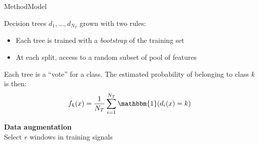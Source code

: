 \begin{frame}{Method}{Model}
\begin{minipage}[t]{0.45\linewidth}
    \vspace{0pt}
    \begin{tcolorbox}[title=Random forest,size=title,boxrule=0.2pt]
        Decision trees $d_1,...,d_{N_T}$ grown with two rules:
        \begin{itemize}
            \item Each tree is trained with a \emph{bootstrap} of the training set
            \item At each split, access to a random subset of pool of features
        \end{itemize}
        Each tree is a ``vote'' for a class.
        The estimated probability of belonging to class $k$ is then:
        \begin{equation*}
            f_{k}(x) = \frac{1}{N_T}\sum_{i=1}^{N_T}\mathbbm{1}(d_i(x)=k)
        \end{equation*}

    \end{tcolorbox}
\end{minipage}\hfill
\begin{minipage}[t]{0.52\linewidth}
    \vspace{0pt}
    \pause
    \centering\textbf{Data augmentation}\\
    Select $r$ windows in training signals

    \centering
    

\end{minipage}
\end{frame}
